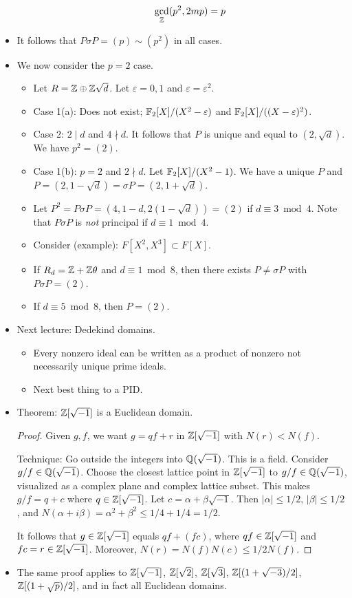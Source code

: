 \documentclass[../notes.tex]{subfiles}
\begin{document}
\begin{itemize}
\begin{itemize}
        \begin{equation*}
            \gcd_{\mathbb{Z}}(p^2,2mp) = p
        \end{equation*}
    \end{itemize}
    \item It follows that $P\sigma P=(p)\sim(p^2)$ in all cases.
    \item We now consider the $p=2$ case.
    \begin{itemize}
        \item Let $R=\mathbb{Z}\oplus\mathbb{Z}\sqrt{d}$. Let $\varepsilon=0,1$ and $\varepsilon=\varepsilon^2$.
        \item Case 1(a): Does not exist; $\mathbb{F}_2[X]/(X^2-\varepsilon)$ and $\mathbb{F}_2[X]/((X-\varepsilon)^2)$.
        \item Case 2: $2\mid d$ and $4\nmid d$. It follows that $P$ is unique and equal to $(2,\sqrt{d})$. We have $p^2=(2)$.
        \item Case 1(b): $p=2$ and $2\nmid d$. Let $\mathbb{F}_2[X]/(X^2-1)$. We have a unique $P$ and $P=(2,1-\sqrt{d})=\sigma P=(2,1+\sqrt{d})$.
        \item Let $P^2=P\sigma P=(4,1-d,2(1-\sqrt{d}))=(2)$ if $d\equiv 3\bmod 4$. Note that $P\sigma P$ is \emph{not} principal if $d\equiv 1\bmod 4$.
        \item Consider (example): $F[X^2,X^3]\subset F[X]$.
        \item If $R_d=\mathbb{Z}+\mathbb{Z}\theta$ and $d\equiv 1\bmod 8$, then there exists $P\neq\sigma P$ with $P\sigma P=(2)$.
        \item If $d\equiv 5\bmod 8$, then $P=(2)$.
    \end{itemize}
    \item Next lecture: Dedekind domains.
    \begin{itemize}
        \item Every nonzero ideal can be written as a product of nonzero not necessarily unique prime ideals.
        \item Next best thing to a PID.
    \end{itemize}
    \item Theorem: $\mathbb{Z}[\sqrt{-1}]$ is a Euclidean domain.
    \begin{proof}
        Given $g,f$, we want $g=qf+r$ in $\mathbb{Z}[\sqrt{-1}]$ with $N(r)<N(f)$.\par
        Technique: Go outside the integers into $\mathbb{Q}(\sqrt{-1})$. This is a field. Consider $g/f\in\mathbb{Q}(\sqrt{-1})$. Choose the closest lattice point in $\mathbb{Z}[\sqrt{-1}]$ to $g/f\in\mathbb{Q}(\sqrt{-1})$, visualized as a complex plane and complex lattice subset. This makes $g/f=q+c$ where $q\in\mathbb{Z}[\sqrt{-1}]$. Let $c=\alpha+\beta\sqrt{-1}$. Then $|\alpha|\leq 1/2$, $|\beta|\leq 1/2$, and $N(\alpha+i\beta)=\alpha^2+\beta^2\leq 1/4+1/4=1/2$.\par
        It follows that $g\in\mathbb{Z}[\sqrt{-1}]$ equals $qf+(fc)$, where $qf\in\mathbb{Z}[\sqrt{-1}]$ and $fc=r\in\mathbb{Z}[\sqrt{-1}]$. Moreover, $N(r)=N(f)N(c)\leq 1/2N(f)$.
    \end{proof}
    \item The same proof applies to $\mathbb{Z}[\sqrt{-1}]$, $\mathbb{Z}[\sqrt{2}]$, $\mathbb{Z}[\sqrt{3}]$, $\mathbb{Z}[(1+\sqrt{-3})/2]$, $\mathbb{Z}[(1+\sqrt{p})/2]$, and in fact all Euclidean domains.
\end{itemize}
\end{document}
